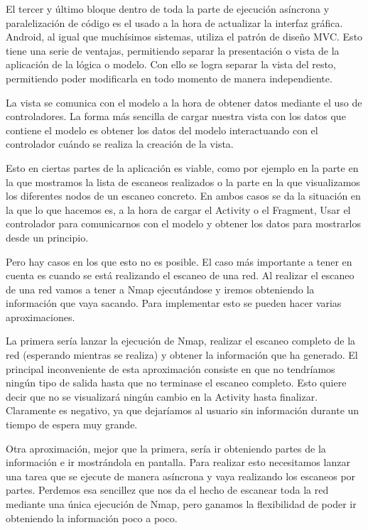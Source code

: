 El tercer y último bloque dentro de toda la parte de ejecución asíncrona y paralelización de código es el usado a la hora de actualizar la interfaz gráfica. Android, al igual que muchísimos sistemas, utiliza el patrón de diseño MVC. Esto tiene una serie de ventajas, permitiendo separar la presentación o vista de la aplicación de la lógica o modelo. Con ello se logra separar la vista del resto, permitiendo poder modificarla en todo momento de manera independiente.

La vista se comunica con el modelo a la hora de obtener datos mediante el uso de controladores. La forma más sencilla de cargar nuestra vista con los datos que contiene el modelo es obtener los datos del modelo interactuando con el controlador cuándo se realiza la creación de la vista.

Esto en ciertas partes de la aplicación es viable, como por ejemplo en la parte en la que mostramos la lista de escaneos realizados o la parte en la que visualizamos los diferentes nodos de un escaneo concreto. En ambos casos se da la situación en la que lo que hacemos es, a la hora de cargar el Activity o el Fragment, Usar el controlador para comunicarnos con el modelo y obtener los datos para mostrarlos desde un principio.

Pero hay casos en los que esto no es posible. El caso más importante a tener en cuenta es  cuando se está realizando el escaneo de una red. Al realizar el escaneo de una red vamos a tener a Nmap ejecutándose y iremos obteniendo la información que vaya sacando. Para implementar esto se pueden hacer varias aproximaciones.

La primera sería lanzar la ejecución de Nmap, realizar el escaneo completo de la red (esperando mientras se realiza) y obtener la información que ha generado. El principal inconveniente de esta aproximación consiste en que no tendríamos ningún tipo de salida hasta que no terminase el escaneo completo. Esto quiere decir que no se visualizará ningún cambio en la Activity hasta finalizar. Claramente es negativo, ya que dejaríamos al usuario sin información durante un tiempo de espera muy grande. 

Otra aproximación, mejor que la primera, sería ir obteniendo partes de la información e ir mostrándola en pantalla. Para realizar esto necesitamos lanzar una tarea que se ejecute de manera asíncrona y vaya realizando los escaneos por partes. Perdemos esa sencillez que nos da el hecho de escanear toda la red mediante una única ejecución de Nmap, pero ganamos la flexibilidad de poder ir obteniendo la información poco a poco.

